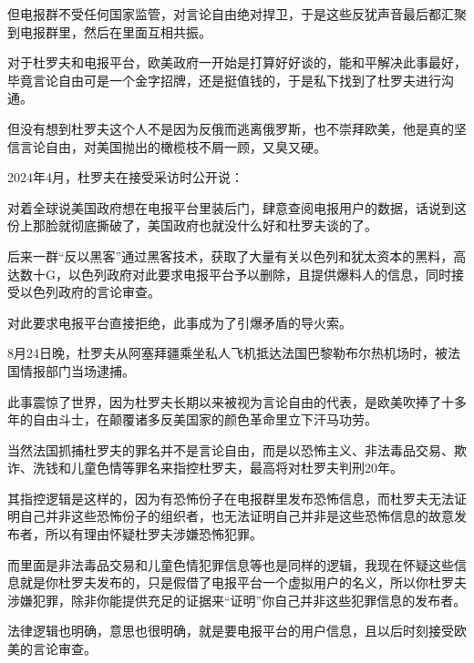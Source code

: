 \documentclass[UTF8,11pt,oneside]{ctexart}
\begin{document}
但电报群不受任何国家监管，对言论自由绝对捍卫，于是这些反犹声音最后都汇聚到电报群里，然后在里面互相共振。

对于杜罗夫和电报平台，欧美政府一开始是打算好好谈的，能和平解决此事最好，毕竟言论自由可是一个金字招牌，还是挺值钱的，于是私下找到了杜罗夫进行沟通。

但没有想到杜罗夫这个人不是因为反俄而逃离俄罗斯，也不崇拜欧美，他是真的坚信言论自由，对美国抛出的橄榄枝不屑一顾，又臭又硬。

2024年4月，杜罗夫在接受采访时公开说：


对着全球说美国政府想在电报平台里装后门，肆意查阅电报用户的数据，话说到这份上那脸就彻底撕破了，美国政府也就没什么好和杜罗夫谈的了。


后来一群“反以黑客”通过黑客技术，获取了大量有关以色列和犹太资本的黑料，高达数十G，以色列政府对此要求电报平台予以删除，且提供爆料人的信息，同时接受以色列政府的言论审查。

对此要求电报平台直接拒绝，此事成为了引爆矛盾的导火索。

8月24日晚，杜罗夫从阿塞拜疆乘坐私人飞机抵达法国巴黎勒布尔热机场时，被法国情报部门当场逮捕。

此事震惊了世界，因为杜罗夫长期以来被视为言论自由的代表，是欧美吹捧了十多年的自由斗士，在颠覆诸多反美国家的颜色革命里立下汗马功劳。


当然法国抓捕杜罗夫的罪名并不是言论自由，而是以恐怖主义、非法毒品交易、欺诈、洗钱和儿童色情等罪名来指控杜罗夫，最高将对杜罗夫判刑20年。

其指控逻辑是这样的，因为有恐怖份子在电报群里发布恐怖信息，而杜罗夫无法证明自己并非这些恐怖份子的组织者，也无法证明自己并非是这些恐怖信息的故意发布者，所以有理由怀疑杜罗夫涉嫌恐怖犯罪。

而里面是非法毒品交易和儿童色情犯罪信息等也是同样的逻辑，我现在怀疑这些信息就是你杜罗夫发布的，只是假借了电报平台一个虚拟用户的名义，所以你杜罗夫涉嫌犯罪，除非你能提供充足的证据来“证明”你自己并非这些犯罪信息的发布者。

法律逻辑也明确，意思也很明确，就是要电报平台的用户信息，且以后时刻接受欧美的言论审查。
\end{document}
